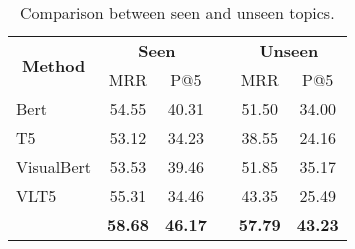 
\begin{table}[!ht]
\centering
\begin{tabular}{lccccc}
\hline
\multicolumn{1}{c}{\multirow{2}{*}{\textbf{Method}}}     & \multicolumn{2}{c}{\textbf{Seen}} & & \multicolumn{2}{c}{\textbf{Unseen}} \\
\cline{2-3} \cline{5-6}
& MRR & P@5 & & MRR & P@5 \\
\hline
Bert & 54.55 & 40.31 & & 51.50 & 34.00\\
T5 & 53.12 & 34.23 && 38.55 & 24.16 \\
VisualBert & 53.53 & 39.46 & & 51.85 & 35.17 \\
VLT5  & 55.31 & 34.46 & & 43.35 & 25.49 \\
\OurModel{} & \textbf{58.68} & \textbf{46.17} &  & \textbf{57.79} & \textbf{43.23}\\
\hline

\end{tabular}
\caption{Comparison between seen and unseen topics.}
\label{tab:seen-unseen}
\vspace{-4mm}
\end{table}
